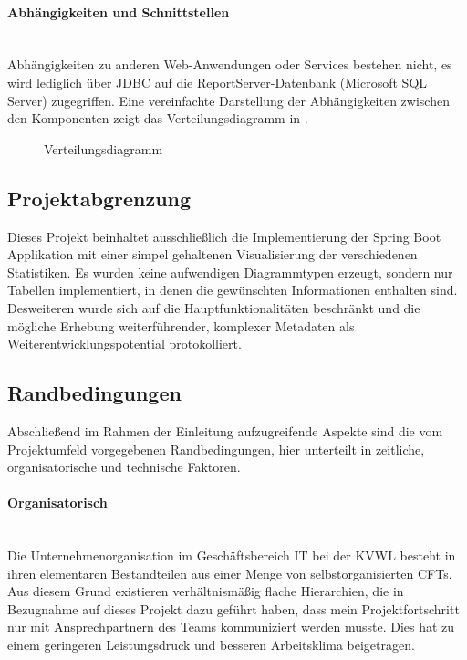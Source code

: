 \paragraph{Abhängigkeiten und Schnittstellen} ~\\
\label{p:Abhaengigkeiten}
Abhängigkeiten zu anderen Web-Anwendungen oder Services bestehen nicht, es wird lediglich über \ac{JDBC} auf die ReportServer-Datenbank (Microsoft SQL Server) zugegriffen. Eine vereinfachte Darstellung der Abhängigkeiten zwischen den Komponenten zeigt das Verteilungsdiagramm in .
\begin{figure}[htb]
	\centering
	\caption{Verteilungsdiagramm}
	\label{fig:Deployment}
\end{figure} 

\subsection{Projektabgrenzung} 
\label{sec:Projektabgrenzung}
Dieses Projekt beinhaltet ausschließlich die Implementierung der Spring Boot Applikation mit einer simpel gehaltenen Visualisierung der verschiedenen Statistiken. Es wurden keine aufwendigen Diagrammtypen erzeugt, sondern nur Tabellen implementiert, in denen die gewünschten Informationen enthalten sind.
Desweiteren wurde sich auf die Hauptfunktionalitäten beschränkt und die mögliche Erhebung weiterführender, komplexer Metadaten als Weiterentwicklungspotential protokolliert.

\subsection{Randbedingungen} 
\label{sec:Randbedingungen}
Abschließend im Rahmen der Einleitung aufzugreifende Aspekte sind die vom Projektumfeld vorgegebenen Randbedingungen, hier unterteilt in zeitliche, organisatorische und technische Faktoren.

\paragraph{Organisatorisch} ~\\
\label{p:Randbedingungen:Organisatorisch}
Die Unternehmenorganisation im Geschäftsbereich IT bei der \ac{KVWL} besteht in ihren elementaren Bestandteilen aus einer Menge von selbstorganisierten \ac{CFT}s. Aus diesem Grund existieren verhältnismäßig flache Hierarchien, die in Bezugnahme auf dieses Projekt dazu geführt haben, dass mein Projektfortschritt nur mit Ansprechpartnern des Teams kommuniziert werden musste. Dies hat zu einem geringeren Leistungsdruck und besseren Arbeitsklima beigetragen.


